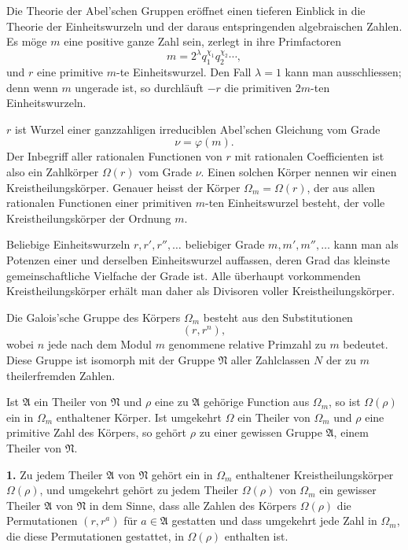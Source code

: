 \documentclass[11pt]{article}
\providecommand{\grpA}{\mathfrak A}
\providecommand{\grpN}{\mathfrak N}
\begin{document}
Die Theorie der Abel'schen Gruppen eröffnet einen tieferen Einblick in die Theorie der Einheitswurzeln und der daraus entspringenden algebraischen Zahlen. Es möge $m$ eine positive ganze Zahl sein, zerlegt in ihre Primfactoren
\begin{equation}
 m=2^\lambda q_1^{\chi_1}q_2^{\chi_2}\cdots,
\tag{1}
\end{equation}
und $r$ eine primitive $m$-te Einheitswurzel. Den Fall $\lambda=1$ kann man ausschliessen; denn wenn $m$ ungerade ist, so durchläuft $-r$ die primitiven $2m$-ten Einheitswurzeln.

$r$ ist Wurzel einer ganzzahligen irreduciblen Abel'schen Gleichung vom Grade
\begin{equation}
 \nu=\varphi(m).
\tag{2}
\end{equation}
Der Inbegriff aller rationalen Functionen von $r$ mit rationalen Coefficienten ist also ein Zahlkörper $\Omega(r)$ vom Grade $\nu$. Einen solchen Körper nennen wir einen Kreistheilungskörper. Genauer heisst der Körper $\Omega_m=\Omega(r)$, der aus allen rationalen Functionen einer primitiven $m$-ten Einheitswurzel besteht, der volle Kreistheilungskörper der Ordnung $m$.

Beliebige Einheitswurzeln $r,r',r'',\ldots$ beliebiger Grade $m,m',m'',\ldots$ kann man als Potenzen einer und derselben Einheitswurzel auffassen, deren Grad das kleinste gemeinschaftliche Vielfache der Grade ist. Alle überhaupt vorkommenden Kreistheilungskörper erhält man daher als Divisoren voller Kreistheilungskörper.

Die Galois'sche Gruppe des Körpers $\Omega_m$ besteht aus den Substitutionen
\begin{equation}
 (r,r^n),
\tag{3}
\end{equation}
wobei $n$ jede nach dem Modul $m$ genommene relative Primzahl zu $m$ bedeutet. Diese Gruppe ist isomorph mit der Gruppe $\grpN$ aller Zahlclassen $N$ der zu $m$ theilerfremden Zahlen.

Ist $\grpA$ ein Theiler von $\grpN$ und $\rho$ eine zu $\grpA$ gehörige Function aus $\Omega_m$, so ist $\Omega(\rho)$ ein in $\Omega_m$ enthaltener Körper. Ist umgekehrt $\Omega$ ein Theiler von $\Omega_m$ und $\rho$ eine primitive Zahl des Körpers, so gehört $\rho$ zu einer gewissen Gruppe $\grpA$, einem Theiler von $\grpN$.

\medskip
\noindent\textbf{1.} Zu jedem Theiler $\grpA$ von $\grpN$ gehört ein in $\Omega_m$ enthaltener Kreistheilungskörper $\Omega(\rho)$, und umgekehrt gehört zu jedem Theiler $\Omega(\rho)$ von $\Omega_m$ ein gewisser Theiler $\grpA$ von $\grpN$ in dem Sinne, dass alle Zahlen des Körpers $\Omega(\rho)$ die Permutationen $(r,r^a)$ für $a\in\grpA$ gestatten und dass umgekehrt jede Zahl in $\Omega_m$, die diese Permutationen gestattet, in $\Omega(\rho)$ enthalten ist.
\end{document}
